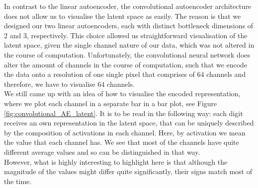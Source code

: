 In contrast to the linear autoencoder, the convolutional autoencoder architecture does not allow us to visualise the latent space as easily. The reason is that we designed our two linear autoencoders, each with distinct bottleneck dimensions of 2 and 3, respectively. This choice allowed us straightforward visualisation of the latent space, given the single channel nature of our data, which was not altered in the course of computation. Unfortunately, the convolutional neural network does alter the amount of channels in the course of computation, such that we encode the data onto a resolution of one single pixel that comprises of $64$ channels and therefore, we have to visualise $64$ channels.\\
We still came up with an idea of how to visualise the encoded representation, where we plot each channel in a separate bar in a bar plot, see Figure \ref{fig:convolutional_AE_latent}. It is to be read in the following way: each digit receives an own representation in the latent space, that can be uniquely described by the composition of activations in each channel. Here, by activation we mean the value that each channel has. We see that most of the channels have quite different average values and so can be distinguished in that way.\\
However, what is highly interesting to highlight here is that although the magnitude of the values might differ quite significantly, their signs match most of the time.



